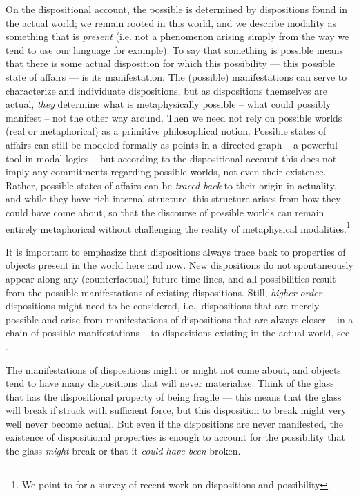 \documentclass{article}
\begin{document}
On the dispositional account, the possible is determined by dispositions found in the actual world; we remain rooted in this world, and we describe modality as something that is \emph{present} (i.e. not a phenomenon arising simply from the way we tend to use our language for example). To say that something is possible means that there is some actual disposition for which this possibility --- this possible state of affairs --- is its manifestation. The (possible) manifestations can serve to characterize and individuate dispositions, but as dispositions themselves are actual, \emph{they} determine what is metaphysically possible -- what could possibly manifest -- not the other way around. Then we need not rely on possible worlds (real or metaphorical) as a primitive philosophical notion. Possible states of affairs can still be modeled formally as points in a directed graph -- a powerful tool in modal logics -- but according to the dispositional account this does not imply any commitments regarding possible worlds, not even their existence. Rather, possible states of affairs can be \emph{traced back} to their origin in actuality, and while they have rich internal structure, this structure arises from how they could have come about, so that the discourse of possible worlds can remain entirely metaphorical without challenging the reality of metaphysical modalities.\footnote{We point to \cite{MwPw} for a survey of recent work on dispositions and possibility}

It is important to emphasize that dispositions always trace back to properties of objects present in the world here and now. New dispositions do not spontaneously appear along any (counterfactual) future time-lines, and all possibilities result from the possible manifestations of existing dispositions. Still, \emph{higher-order} dispositions might need to be considered, i.e., dispositions that are merely possible and arise from manifestations of dispositions that are always closer -- in a chain of possible manifestations -- to dispositions existing in the actual world, see \cite{dispmod}.

The manifestations of dispositions might or might not come about, and objects tend to have many dispositions that will never materialize. Think of the glass that has the dispositional property of being fragile --- this means that the glass will break if struck with sufficient force, but this disposition to break might very well never become actual. But even if the dispositions are never manifested, the existence of dispositional properties is enough to account for the possibility that the glass \emph{might} break or that it \emph{could have been} broken.
\end{document}
